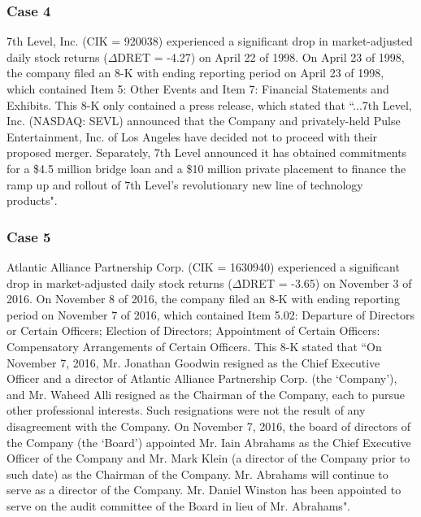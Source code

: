 \begin{small}
\subsubsection*{Case 4}
7th Level, Inc. (CIK = 920038) experienced a significant drop in market-adjusted daily stock returns ($\Delta$DRET = -4.27) on April 22 of 1998. On April 23 of 1998, the company filed an 8-K with ending reporting period on April 23 of 1998, which contained Item 5: Other Events and Item 7: Financial Statements and Exhibits. This 8-K only contained a press release, which stated that ``...7th Level, Inc. (NASDAQ: SEVL) announced that the Company and privately-held Pulse Entertainment, Inc. of Los Angeles have decided not to proceed with their proposed merger.  Separately, 7th Level announced it has obtained commitments for a \$4.5 million bridge loan and a \$10 million private placement to finance the ramp up and rollout of 7th Level's revolutionary new line of technology products".
\subsubsection*{Case 5}
Atlantic Alliance Partnership Corp. (CIK = 1630940) experienced a significant drop in market-adjusted daily stock returns ($\Delta$DRET = -3.65) on November 3 of 2016. On November 8 of 2016, the company filed an 8-K with ending reporting period on November 7 of 2016, which contained Item 5.02: Departure of Directors or Certain Officers; Election of Directors; Appointment of Certain Officers: Compensatory Arrangements of Certain Officers. This 8-K stated that ``On November 7, 2016, Mr. Jonathan Goodwin resigned as the Chief Executive Officer and a director of Atlantic Alliance Partnership Corp. (the `Company'), and Mr. Waheed Alli resigned as the Chairman of the Company, each to pursue other professional interests. Such resignations were not the result of any disagreement with the Company. On November 7, 2016, the board of directors of the Company (the `Board') appointed Mr. Iain Abrahams as the Chief Executive Officer of the Company and Mr. Mark Klein (a director of the Company prior to such date) as the Chairman of the Company. Mr. Abrahams will continue to serve as a director of the Company. Mr. Daniel Winston has been appointed to serve on the audit committee of the Board in lieu of Mr. Abrahams".
\end{small}